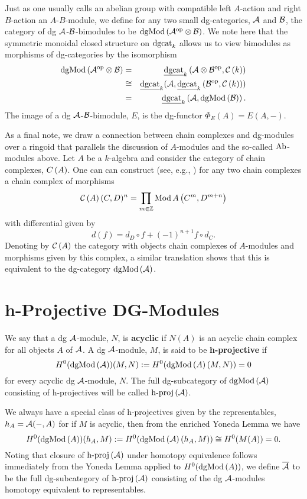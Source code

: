 Just as one usually calls an abelian group with compatible left $A$-action and right $B$-action an $A$-$B$-module, we define for any two small dg-categories, \(\mathcal{A}\) and \(\mathcal{B}\), the category of dg \(\mathcal{A}\)-\(\mathcal{B}\)-bimodules to be \(\operatorname{dgMod}\left(\mathcal{A}^{{\operatorname{op}}} \otimes \mathcal{B}\right)\).
We note here that the symmetric monoidal closed structure on \(\operatorname{dgcat}_k\) allows us to view bimodules as morphisms of dg-categories by the isomorphism
\begin{eqnarray*}
  \operatorname{dgMod}\left(\mathcal{A}^{{\operatorname{op}}} \otimes \mathcal{B}\right) &=& \underline{\operatorname{dgcat}}_{k}\left(\mathcal{A} \otimes \mathcal{B}^{{\operatorname{op}}}, \mathcal{C}\left(k\right)\right)\\
  &\cong& \underline{\operatorname{dgcat}}_{k}(\mathcal{A}, \underline{\operatorname{dgcat}}_{k}\left(\mathcal{B}^{{\operatorname{op}}}, \mathcal{C}\left(k\right)\right))\\
  &=& \underline{\operatorname{dgcat}}_{k}\left(\mathcal{A}, \operatorname{dgMod}\left(\mathcal{B}\right)\right).
\end{eqnarray*}
The image of a dg \(\mathcal{A}\)-\(\mathcal{B}\)-bimodule, \(E\), is the dg-functor \(\Phi_E(A) = E(A,-)\).

As a final note, we draw a connection between chain complexes and dg-modules over a ringoid that parallels the discussion of $A$-modules and the so-called $\operatorname{Ab}$-modules above.
Let $A$ be a $k$-algebra and consider the category of chain complexes, $C\left(A\right)$.
One can can construct (see, e.g., \cite{Weibel94}) for any two chain complexes a chain complex of morphisms
\[\mathcal{C}\left(A\right)(C,D)^n = \prod_{m \in \mathbb{Z}}\operatorname{Mod}A\left(C^m, D^{m + n}\right)\]
with differential given by
\[d(f) = d_D \circ f + (-1)^{n+1} f \circ d_C.\]
Denoting by $\mathcal{C}\left(A\right)$ the category with objects chain complexes of $A$-modules and morphisms given by this complex, a similar translation shows that this is equivalent to the dg-category $\operatorname{dgMod}\left(\mathcal{A}\right)$.

\section{h-Projective DG-Modules}
We say that a dg \(\mathcal{A}\)-module, \(N\), is \textbf{acyclic} if \(N(A)\) is an acyclic chain complex for all objects \(A\) of \(\mathcal{A}\).
A dg \(\mathcal{A}\)-module, \(M\), is said to be \textbf{h-projective} if
\[H^0(\operatorname{dgMod}\left(\mathcal{A}\right))(M,N) := H^0(\operatorname{dgMod}\left(A\right)(M,N)) = 0\]
for every acyclic dg \(\mathcal{A}\)-module, \(N\).
The full dg-subcategory of \(\operatorname{dgMod}\left(\mathcal{A}\right)\) consisting of h-projectives will be called \(\operatorname{h-proj}\left(\mathcal{A}\right)\).

We always have a special class of h-projectives given by the representables, \(h_A = \mathcal{A}(-, A)\) for if \(M\) is acyclic, then from the enriched Yoneda Lemma we have
\[H^0(\operatorname{dgMod}\left(A\right))(h_A,M) := H^0(\operatorname{dgMod}\left(\mathcal{A}\right)(h_A, M)) \cong H^0(M(A)) = 0.\]
Noting that closure of \(\operatorname{h-proj}\left(\mathcal{A}\right)\) under homotopy equivalence follows immediately from the Yoneda Lemma applied to \(H^0(\operatorname{dgMod}\left(A\right))\), we define \(\overline{\mathcal{A}}\) to be the full dg-subcategory of \(\operatorname{h-proj}\left(\mathcal{A}\right)\) consisting of the dg \(\mathcal{A}\)-modules homotopy equivalent to representables.

